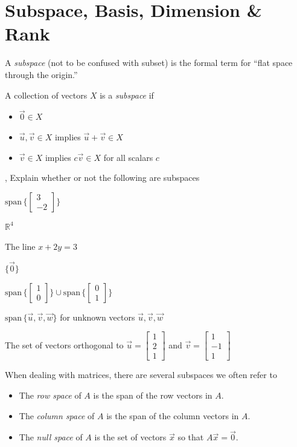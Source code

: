 \documentclass[letter]{article}
\newcommand{\R}{\mathbb{R}}
\renewcommand{\span}{\mathrm{span}\,}
\newcommand{\mat}[1]{\begin{bmatrix}#1\end{bmatrix}}
\begin{document}
\newpage
\section*{Subspace, Basis, Dimension \& Rank }

\begin{Def}
A \emph{subspace} (not to be confused with subset) is the formal term for ``flat
space through the origin.''

A collection of vectors $X$ is a \emph{subspace} if
\begin{itemize}
	\item $\vec 0\in X$
	\item $\vec u,\vec v\in X$ implies $\vec u+\vec v\in X$
	\item $\vec v\in X$ implies $c\vec v\in X$ for all scalars $c$
\end{itemize}
\vspace{-.3in}
\end{Def}

\sep
Explain whether or not the following are subspaces
\begin{Enum}
	\item $\span\{\mat{3\\-2}\}$
	\item $\R^4$
	\item The line $x+2y=3$
	\item $\{\vec 0\}$
	\item $\span \{\mat{1\\0}\}\cup \span\{\mat{0\\1}\}$
	\item $\span \{\vec u,\vec v,\vec w\}$ for unknown vectors $\vec u,\vec v,\vec w$
	\item The set of vectors orthogonal to $\vec u=\mat{1\\2\\1}$ and $\vec v=\mat{1\\-1\\1}$
\end{Enum}

When dealing with matrices, there are several subspaces we often refer to 
\begin{itemize}
	\item The \emph{row space} of $A$ is the span of the row vectors in $A$.
	\item The \emph{column space} of $A$ is the span of the column vectors in $A$.
	\item The \emph{null space} of $A$ is the set of vectors $\vec x$ so that 
		$A\vec x=\vec 0$.
\end{itemize}
\end{document}
